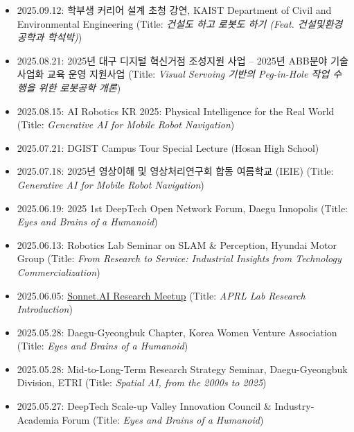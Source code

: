 \documentclass{cv} %
\begin{document}
\begin{itemize}[label=$\cdot$]
    \item 2025.09.12: \textsf{학부생 커리어 설계 초청 강연}, KAIST Department of Civil and Environmental Engineering
    \hfill (Title: \textit{\textsf{건설도 하고 로봇도 하기 (Feat. 건설및환경공학과 학석박)}})

    \item 2025.08.21: \textsf{2025년 대구 디지털 혁신거점 조성지원 사업 -- 2025년 ABB분야 기술사업화 교육 운영 지원사업}
    \hfill (Title: \textit{\textsf{Visual Servoing 기반의 Peg-in-Hole 작업 수행을 위한 로봇공학 개론}})

    \item 2025.08.15: AI Robotics KR 2025: Physical Intelligence for the Real World
        \hfill (Title: \textit{Generative AI for Mobile Robot Navigation})

    \item 2025.07.21: DGIST Campus Tour Special Lecture (Hosan High School)

    \item 2025.07.18: \textsf{2025년 영상이해 및 영상처리연구회 합동 여름학교} (IEIE)
        \hfill (Title: \textit{Generative AI for Mobile Robot Navigation})

    \item 2025.06.19: 2025 1st DeepTech Open Network Forum, Daegu Innopolis
    \hfill (Title: \textit{Eyes and Brains of a Humanoid})

    \item 2025.06.13: Robotics Lab Seminar on SLAM \& Perception, Hyundai Motor Group
    \hfill (Title: \textit{From Research to Service: Industrial Insights from Technology Commercialization})

    \item 2025.06.05: \href{https://sonnet.ai}{Sonnet.AI Research Meetup}
    \hfill (Title: \textit{APRL Lab Research Introduction})

    \item 2025.05.28: Daegu-Gyeongbuk Chapter, Korea Women Venture Association
    \hfill (Title: \textit{Eyes and Brains of a Humanoid})

    \item 2025.05.28: Mid-to-Long-Term Research Strategy Seminar, Daegu-Gyeongbuk Division, ETRI
    \hfill (Title: \textit{Spatial AI, from the 2000s to 2025})

    \item 2025.05.27: DeepTech Scale-up Valley Innovation Council \& Industry-Academia Forum
    \hfill (Title: \textit{Eyes and Brains of a Humanoid})


\end{itemize}
\end{document}
